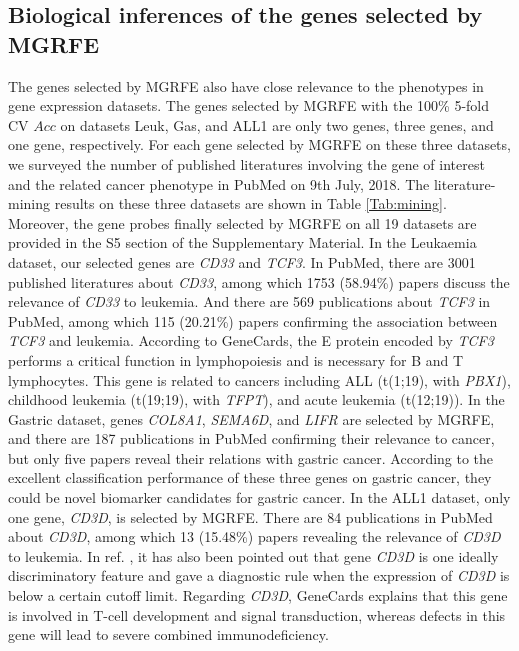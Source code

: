 \documentclass[10pt,journal,compsoc]{IEEEtran}
\begin{document}
	\subsection{Biological inferences of the genes selected by MGRFE}
	
	The genes selected by MGRFE also have close relevance to the phenotypes in gene expression datasets. The genes selected by MGRFE with the 100\% 5-fold CV $Acc$ on datasets Leuk, Gas, and ALL1 are only two genes, three genes, and one gene, respectively.
	For each gene selected by MGRFE on these three datasets, we surveyed the number of published literatures involving the gene of interest and the related cancer phenotype in PubMed on 9th July, 2018. The literature-mining results on these three datasets are shown in Table \ref{Tab:mining}. Moreover, the gene probes finally selected by MGRFE on all 19 datasets are provided in the S5 section of the Supplementary Material.
	In the Leukaemia dataset, our selected genes are \textit{CD33} and \textit{TCF3}. In PubMed, there are 3001 published literatures about \textit{CD33}, among which 1753 (58.94\%) papers discuss the relevance of \textit{CD33} to leukemia. And there are 569 publications about \textit{TCF3} in PubMed, among which 115 (20.21\%) papers confirming the association between \textit{TCF3} and leukemia. According to GeneCards, the E protein encoded by \textit{TCF3} performs a critical function in lymphopoiesis and is necessary for B and T lymphocytes. This gene is related to cancers including ALL (t(1;19), with \textit{PBX1}), childhood leukemia (t(19;19), with \textit{TFPT}), and acute leukemia (t(12;19)). In the Gastric dataset, genes \textit{COL8A1}, \textit{SEMA6D}, and \textit{LIFR} are selected by MGRFE, and there are 187 publications in PubMed confirming their relevance to cancer, but only five papers reveal their relations with gastric cancer. According to the excellent classification performance of these three genes on gastric cancer, they could be novel biomarker candidates for gastric cancer. In the ALL1 dataset, only one gene, \textit{CD3D}, is selected by MGRFE. There are 84 publications in PubMed about \textit{CD3D}, among which 13 (15.48\%) papers revealing the relevance of \textit{CD3D} to leukemia. In ref. \cite{Y34}, it has also been pointed out that gene \textit{CD3D} is one ideally discriminatory feature and gave a diagnostic rule when the expression of \textit{CD3D} is below a certain cutoff limit. Regarding \textit{CD3D}, GeneCards explains that this gene is involved in T-cell development and signal transduction, whereas defects in this gene will lead to severe combined immunodeficiency.
\end{document}
